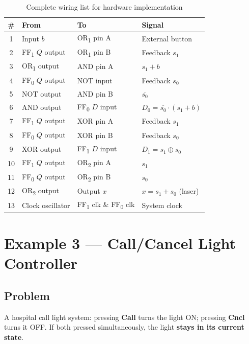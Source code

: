 \documentclass[12pt, a4paper]{article}
\begin{document}
\begin{table}[H]
\centering
\renewcommand{\arraystretch}{1.4}
\begin{tabular}{@{} c l l l @{}}
  \toprule
  \textbf{\#} & \textbf{From} & \textbf{To} & \textbf{Signal} \\
  \midrule
  1 & Input $b$ & OR\textsubscript{1} pin A & External button \\
  2 & FF\textsubscript{1} $Q$ output & OR\textsubscript{1} pin B & Feedback $s_1$ \\
  3 & OR\textsubscript{1} output & AND pin A & $s_1 + b$ \\
  4 & FF\textsubscript{0} $Q$ output & NOT input & Feedback $s_0$ \\
  5 & NOT output & AND pin B & $\overline{s_0}$ \\
  6 & AND output & FF\textsubscript{0} $D$ input & $D_0 = \overline{s_0} \cdot (s_1 + b)$ \\
  7 & FF\textsubscript{1} $Q$ output & XOR pin A & Feedback $s_1$ \\
  8 & FF\textsubscript{0} $Q$ output & XOR pin B & Feedback $s_0$ \\
  9 & XOR output & FF\textsubscript{1} $D$ input & $D_1 = s_1 \oplus s_0$ \\
  10 & FF\textsubscript{1} $Q$ output & OR\textsubscript{2} pin A & $s_1$ \\
  11 & FF\textsubscript{0} $Q$ output & OR\textsubscript{2} pin B & $s_0$ \\
  12 & OR\textsubscript{2} output & Output $x$ & $x = s_1 + s_0$ (laser) \\
  13 & Clock oscillator & FF\textsubscript{1} clk \& FF\textsubscript{0} clk & System clock \\
  \bottomrule
\end{tabular}
\caption{Complete wiring list for hardware implementation}
\label{tab:wiring}
\end{table}

\section{Example 3 --- Call/Cancel Light Controller}

\subsection{Problem}
A hospital call light system: pressing \textbf{Call} turns the light ON; pressing \textbf{Cncl} turns it OFF. If both pressed simultaneously, the light \textbf{stays in its current state}.
\end{document}
